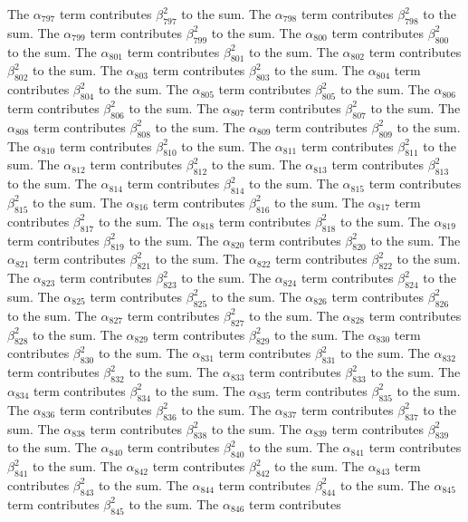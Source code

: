 \begin{lemma}
The $\alpha_{797}$ term contributes $\beta_{797}^{2}$ to the sum. The $\alpha_{798}$ term contributes $\beta_{798}^{2}$ to the sum. The $\alpha_{799}$ term contributes $\beta_{799}^{2}$ to the sum. The $\alpha_{800}$ term contributes $\beta_{800}^{2}$ to the sum. The $\alpha_{801}$ term contributes $\beta_{801}^{2}$ to the sum. The $\alpha_{802}$ term contributes $\beta_{802}^{2}$ to the sum. The $\alpha_{803}$ term contributes $\beta_{803}^{2}$ to the sum. The $\alpha_{804}$ term contributes $\beta_{804}^{2}$ to the sum. The $\alpha_{805}$ term contributes $\beta_{805}^{2}$ to the sum. The $\alpha_{806}$ term contributes $\beta_{806}^{2}$ to the sum. The $\alpha_{807}$ term contributes $\beta_{807}^{2}$ to the sum. The $\alpha_{808}$ term contributes $\beta_{808}^{2}$ to the sum. The $\alpha_{809}$ term contributes $\beta_{809}^{2}$ to the sum. The $\alpha_{810}$ term contributes $\beta_{810}^{2}$ to the sum. The $\alpha_{811}$ term contributes $\beta_{811}^{2}$ to the sum. The $\alpha_{812}$ term contributes $\beta_{812}^{2}$ to the sum. The $\alpha_{813}$ term contributes $\beta_{813}^{2}$ to the sum. The $\alpha_{814}$ term contributes $\beta_{814}^{2}$ to the sum. The $\alpha_{815}$ term contributes $\beta_{815}^{2}$ to the sum. The $\alpha_{816}$ term contributes $\beta_{816}^{2}$ to the sum. The $\alpha_{817}$ term contributes $\beta_{817}^{2}$ to the sum. The $\alpha_{818}$ term contributes $\beta_{818}^{2}$ to the sum. The $\alpha_{819}$ term contributes $\beta_{819}^{2}$ to the sum. The $\alpha_{820}$ term contributes $\beta_{820}^{2}$ to the sum. The $\alpha_{821}$ term contributes $\beta_{821}^{2}$ to the sum. The $\alpha_{822}$ term contributes $\beta_{822}^{2}$ to the sum. The $\alpha_{823}$ term contributes $\beta_{823}^{2}$ to the sum. The $\alpha_{824}$ term contributes $\beta_{824}^{2}$ to the sum. The $\alpha_{825}$ term contributes $\beta_{825}^{2}$ to the sum. The $\alpha_{826}$ term contributes $\beta_{826}^{2}$ to the sum. The $\alpha_{827}$ term contributes $\beta_{827}^{2}$ to the sum. The $\alpha_{828}$ term contributes $\beta_{828}^{2}$ to the sum. The $\alpha_{829}$ term contributes $\beta_{829}^{2}$ to the sum. The $\alpha_{830}$ term contributes $\beta_{830}^{2}$ to the sum. The $\alpha_{831}$ term contributes $\beta_{831}^{2}$ to the sum. The $\alpha_{832}$ term contributes $\beta_{832}^{2}$ to the sum. The $\alpha_{833}$ term contributes $\beta_{833}^{2}$ to the sum. The $\alpha_{834}$ term contributes $\beta_{834}^{2}$ to the sum. The $\alpha_{835}$ term contributes $\beta_{835}^{2}$ to the sum. The $\alpha_{836}$ term contributes $\beta_{836}^{2}$ to the sum. The $\alpha_{837}$ term contributes $\beta_{837}^{2}$ to the sum. The $\alpha_{838}$ term contributes $\beta_{838}^{2}$ to the sum. The $\alpha_{839}$ term contributes $\beta_{839}^{2}$ to the sum. The $\alpha_{840}$ term contributes $\beta_{840}^{2}$ to the sum. The $\alpha_{841}$ term contributes $\beta_{841}^{2}$ to the sum. The $\alpha_{842}$ term contributes $\beta_{842}^{2}$ to the sum. The $\alpha_{843}$ term contributes $\beta_{843}^{2}$ to the sum. The $\alpha_{844}$ term contributes $\beta_{844}^{2}$ to the sum. The $\alpha_{845}$ term contributes $\beta_{845}^{2}$ to the sum. The $\alpha_{846}$ term contributes 
\end{lemma}
